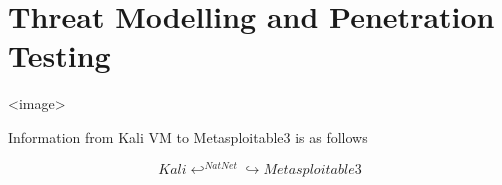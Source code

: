 \section{Threat Modelling and Penetration Testing}

<image>

\begin{flushleft}
Information from Kali VM to Metasploitable3 is as follows

\[
	Kali \hookleftarrow ^{NatNet} \hookrightarrow Metasploitable3
\]
\end{flushleft}
